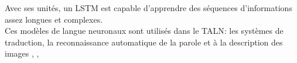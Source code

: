 
 Avec ses unités, un LSTM est capable d'apprendre des séquences d'informations assez longues et complexes.\\

 Ces modèles de langue neuronaux sont utilisés dans le TALN: les systèmes de traduction, la reconnaissance automatique de la parole et à la description des images \cite{mao2015learning} \cite{mikolov2010recurrent}, \cite{mikolov2011extensions},\cite{mikolov2013distributed} \cite{graves2014towards} \cite{sutskever2014sequence}


\smallskip

